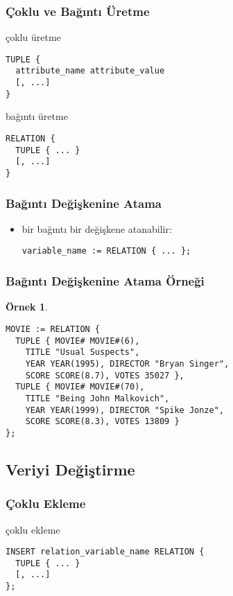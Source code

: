\documentclass[dvipsnames]{beamer}
\theoremstyle{definition}
\theoremstyle{example}
\newtheorem{ornek}[theorem]{Örnek}
\theoremstyle{plain}
\begin{document}
\begin{frame}[fragile]
  \frametitle{Çoklu ve Bağıntı Üretme}

  \begin{block}{çoklu üretme}
    \begin{lstlisting}
TUPLE {
  attribute_name attribute_value
  [, ...]
}
    \end{lstlisting}
  \end{block}

  \pause
  \begin{block}{bağıntı üretme}
    \begin{lstlisting}
RELATION {
  TUPLE { ... }
  [, ...]
}
    \end{lstlisting}
  \end{block}
\end{frame}

\begin{frame}[fragile]
  \frametitle{Bağıntı Değişkenine Atama}

  \begin{itemize}
    \item bir bağıntı bir değişkene atanabilir:
    \begin{lstlisting}
variable_name := RELATION { ... };
    \end{lstlisting}
  \end{itemize}
\end{frame}

\begin{frame}[fragile]
  \frametitle{Bağıntı Değişkenine Atama Örneği}

  \begin{ornek}
    \begin{lstlisting}
MOVIE := RELATION {
  TUPLE { MOVIE# MOVIE#(6),
    TITLE "Usual Suspects",
    YEAR YEAR(1995), DIRECTOR "Bryan Singer",
    SCORE SCORE(8.7), VOTES 35027 },
  TUPLE { MOVIE# MOVIE#(70),
    TITLE "Being John Malkovich",
    YEAR YEAR(1999), DIRECTOR "Spike Jonze",
    SCORE SCORE(8.3), VOTES 13809 }
};
    \end{lstlisting}
  \end{ornek}
\end{frame}

\subsection{Veriyi Değiştirme}

\begin{frame}[fragile]
  \frametitle{Çoklu Ekleme}

  \begin{block}{çoklu ekleme}
    \begin{lstlisting}
INSERT relation_variable_name RELATION {
  TUPLE { ... }
  [, ...]
};
    \end{lstlisting}
  \end{block}
\end{frame}
\end{document}

